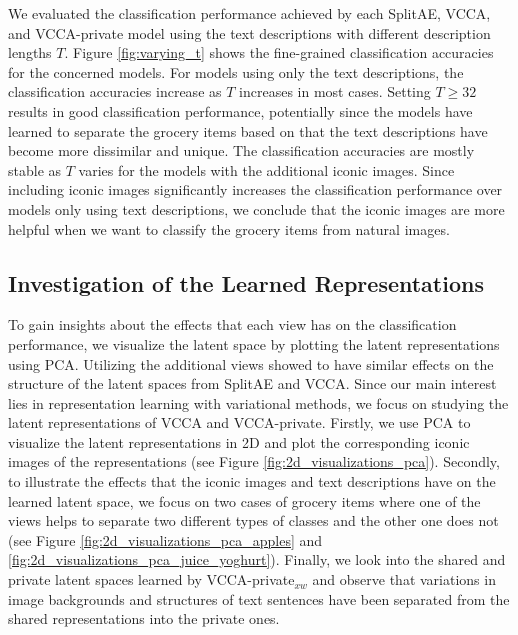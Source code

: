 


We evaluated the classification performance achieved by each SplitAE, VCCA, and VCCA-private model using the text descriptions with different description lengths $T$. Figure \ref{fig:varying_t} shows the fine-grained classification accuracies for the concerned models. For models using only the text descriptions, the classification accuracies increase as $T$ increases in most cases. Setting $T \geq 32$ results in good classification performance, potentially since the models have learned to separate the grocery items based on that the text descriptions have become more dissimilar and unique. The classification accuracies are mostly stable as $T$ varies for the models with the additional iconic images. Since including iconic images significantly increases the classification performance over models only using text descriptions, we conclude that the iconic images are more helpful when we want to classify the grocery items from natural images. 





\subsection{Investigation of the Learned Representations}
\label{paperB:sec:investigation_of_the_learned_representations}

To gain insights about the effects that each view has on the classification performance, we visualize the latent space by plotting the latent representations using PCA. Utilizing the additional views showed to have similar effects on the structure of the latent spaces from SplitAE and VCCA. 
Since our main interest lies in representation learning with variational methods, we focus on studying the latent representations of VCCA and VCCA-private. 
Firstly, we use PCA to visualize the latent representations in 2D and plot the corresponding iconic images of the representations (see Figure \ref{fig:2d_visualizations_pca}). Secondly, to illustrate the effects that the iconic images and text descriptions have on the learned latent space, we focus on two cases of grocery items where one of the views helps to separate two different types of classes and the other one does not (see Figure \ref{fig:2d_visualizations_pca_apples} and \ref{fig:2d_visualizations_pca_juice_yoghurt}). Finally, we look into the shared and private latent spaces learned by VCCA-private$_{x w}$ and observe that variations in image backgrounds and structures of text sentences have been separated from the shared representations into the private ones. 


